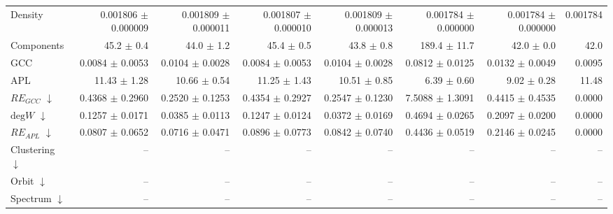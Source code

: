 \begin{table}[H]
\begin{tabular}{lrrrrrrr}
Density                       & 0.001806 $\pm$ 0.000009 & 0.001809 $\pm$ 0.000011 & 0.001807 $\pm$ 0.000010 & 0.001809 $\pm$ 0.000013 & 0.001784 $\pm$ 0.000000 & 0.001784 $\pm$ 0.000000 & 0.001784 \\
Components                    & 45.2 $\pm$ 0.4 & 44.0 $\pm$ 1.2 & 45.4 $\pm$ 0.5 & 43.8 $\pm$ 0.8 & 189.4 $\pm$ 11.7 & 42.0 $\pm$ 0.0 & 42.0 \\
GCC                           & 0.0084 $\pm$ 0.0053 & 0.0104 $\pm$ 0.0028 & 0.0084 $\pm$ 0.0053 & 0.0104 $\pm$ 0.0028 & 0.0812 $\pm$ 0.0125 & 0.0132 $\pm$ 0.0049 & 0.0095 \\
APL                           & 11.43 $\pm$ 1.28 & 10.66 $\pm$ 0.54 & 11.25 $\pm$ 1.43 & 10.51 $\pm$ 0.85 & 6.39 $\pm$ 0.60 & 9.02 $\pm$ 0.28 & 11.48 \\
\midrule
$RE_{GCC}$ $\downarrow$       & 0.4368 $\pm$ 0.2960 & 0.2520 $\pm$ 0.1253 & 0.4354 $\pm$ 0.2927 & 0.2547 $\pm$ 0.1230 & 7.5088 $\pm$ 1.3091 & 0.4415 $\pm$ 0.4535 & 0.0000 \\
$\mathrm{deg}W$ $\downarrow$  & 0.1257 $\pm$ 0.0171 & 0.0385 $\pm$ 0.0113 & 0.1247 $\pm$ 0.0124 & 0.0372 $\pm$ 0.0169 & 0.4694 $\pm$ 0.0265 & 0.2097 $\pm$ 0.0200 & 0.0000 \\
$RE_{APL}$ $\downarrow$       & 0.0807 $\pm$ 0.0652 & 0.0716 $\pm$ 0.0471 & 0.0896 $\pm$ 0.0773 & 0.0842 $\pm$ 0.0740 & 0.4436 $\pm$ 0.0519 & 0.2146 $\pm$ 0.0245 & 0.0000 \\
Clustering $\downarrow$       & -- & -- & -- & -- & -- & -- & -- \\
Orbit $\downarrow$            & -- & -- & -- & -- & -- & -- & -- \\
Spectrum $\downarrow$         & -- & -- & -- & -- & -- & -- & -- \\
\bottomrule
\end{tabular}
\end{table}
